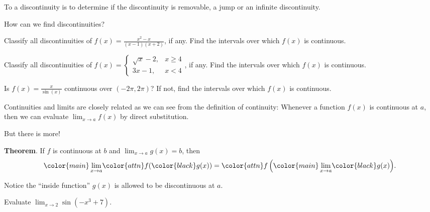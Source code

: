 \documentclass[../main.tex]{subfiles}
\begin{document}
  To  a discontinuity is to determine if the discontinuity is removable, a jump or an infinite discontinuity.

  \faComments{} How can we find discontinuities?

  \begin{example}
    Classify all discontinuities of \(f(x) = \frac{x^{2}-x}{(x-1)(x+2)}\), if any.  Find the intervals over which \(f(x)\) is continuous.

  \end{example}

  \begin{example}
    Classify all discontinuities of \(f(x) = \begin{cases} \sqrt{x} - 2,& x \ge 4 \\ 3x - 1, &x < 4\end{cases}\), if any.  Find the intervals over which \(f(x)\) is continuous.

  \end{example}
  \clearpage

  \begin{example}
    Is \(f(x) = \frac{x}{\sin(x)}\) continuous over \((-2\pi, 2\pi)\)? If not, find the intervals over which \(f(x)\) is continuous.
  \end{example}

  
  Continuities and limits are closely related as we can see from the definition of continuity: Whenever a function \(f(x)\) is {continuous} at \(a\), then we can evaluate \(\lim_{x \to a} f(x)\) by direct substitution. 

  But there is more!

  \begin{mdframed}[style=withref]
    \textbf{Theorem}. If \(f\) is continuous at \(b\) and \(\lim_{x \to a} g(x) = b\), then 
    \[
      {\color{main} \lim_{x \to a}} {\color{attn}f({\color{black}g(x)})} = {\color{attn}f \left( {\color{main} \lim_{x \to a}} {\color{black} g(x) }\right)}.
    \]

  \end{mdframed}

  Notice the ``inside function'' \(g(x)\) is allowed to be discontinuous at \(a\).

  \begin{example}
    Evaluate \(\lim_{x \to 2} \sin( - x^{3} + 7  )\).
  \end{example}
  \clearpage
\end{document}

